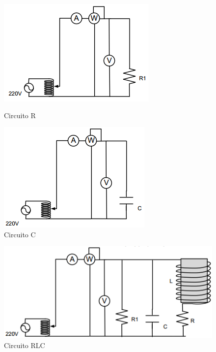 \documentclass[a4paper]{article}
\begin{document}
\begin{figure}[H]
\centering
\begin{minipage}{.5\textwidth}
  \centering
  \includegraphics[width=.8\linewidth]{Circuito-ejercicio-2A}
  \caption{Circuito R}
\end{minipage}%
\begin{minipage}{.5\textwidth}
  \centering
  \includegraphics[width=.8\linewidth]{Circuito-ejercicio-2B}
  \caption{Circuito C}

\end{minipage}%
\end{figure}
\begin{figure}[H]
\centering
\begin{minipage}{.5\textwidth}
  \centering
  \includegraphics[width=.8\linewidth]{Circuito-ejercicio-2C}
  \caption{Circuito RLC}
  \label{fig:2b}
\end{minipage}
\end{figure}
\end{document}
